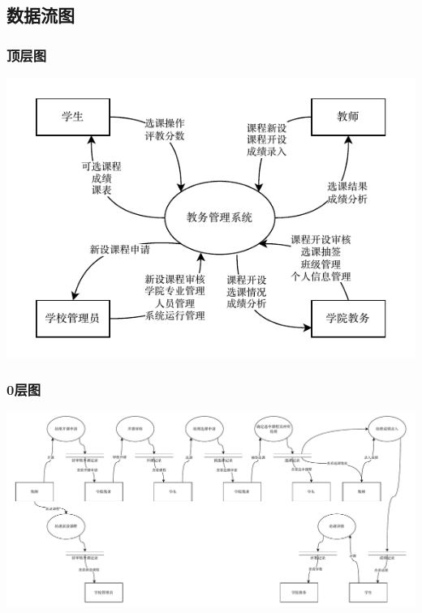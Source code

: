 \subsection{数据流图}
\subsubsection{顶层图}
\begin{center}
    \includegraphics[scale=1.2]{img/requirements/top}
\end{center}
\subsubsection{0层图}
\begin{center}
    \includegraphics[scale=0.45]{img/requirements/zero}
\end{center}

